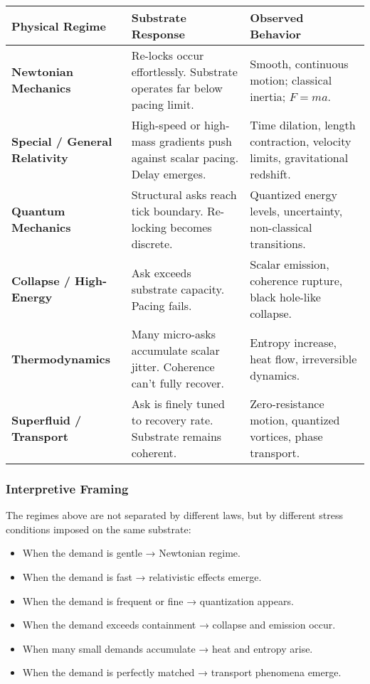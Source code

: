 \documentclass[entropy,article,submit,pdftex,moreauthors]{Definitions/mdpi}
\begin{document}
\renewcommand{\arraystretch}{1.4}
\begin{center}
\begin{tabular}{|p{3.5cm}|p{4.5cm}|p{4.5cm}|}
\hline
\textbf{Physical Regime} & \textbf{Substrate Response} & \textbf{Observed Behavior} \\
\hline
\textbf{Newtonian Mechanics} & Re-locks occur effortlessly. Substrate operates far below pacing limit. & Smooth, continuous motion; classical inertia; \( F = ma \). \\
\hline
\textbf{Special / General Relativity} & High-speed or high-mass gradients push against scalar pacing. Delay emerges. & Time dilation, length contraction, velocity limits, gravitational redshift. \\
\hline
\textbf{Quantum Mechanics} & Structural asks reach tick boundary. Re-locking becomes discrete. & Quantized energy levels, uncertainty, non-classical transitions. \\
\hline
\textbf{Collapse / High-Energy} & Ask exceeds substrate capacity. Pacing fails. & Scalar emission, coherence rupture, black hole-like collapse. \\
\hline
\textbf{Thermodynamics} & Many micro-asks accumulate scalar jitter. Coherence can’t fully recover. & Entropy increase, heat flow, irreversible dynamics. \\
\hline
\textbf{Superfluid / Transport} & Ask is finely tuned to recovery rate. Substrate remains coherent. & Zero-resistance motion, quantized vortices, phase transport. \\
\hline
\end{tabular}
\end{center}

\subsubsection{Interpretive Framing}

The regimes above are not separated by different laws, but by different stress conditions imposed on the same substrate:

\begin{itemize}
    \item When the demand is gentle → Newtonian regime.
    \item When the demand is fast → relativistic effects emerge.
    \item When the demand is frequent or fine → quantization appears.
    \item When the demand exceeds containment → collapse and emission occur.
    \item When many small demands accumulate → heat and entropy arise.
    \item When the demand is perfectly matched → transport phenomena emerge.
\end{itemize}
\end{document}
